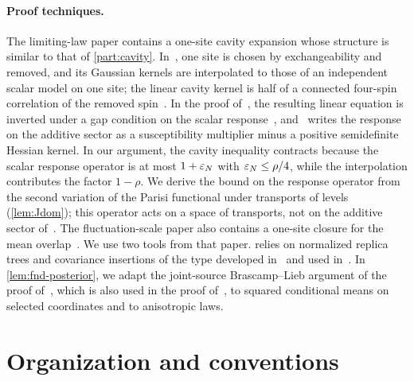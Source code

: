 \paragraph{Proof techniques.}
The limiting-law paper contains a one-site cavity expansion whose
structure is similar to that of \cref{part:cavity}.
In~\cite[Lemma~2.2]{OpenAILimitingLaw}, one site is chosen by
exchangeability and removed, and its Gaussian kernels are interpolated
to those of an independent scalar model on one site; the linear cavity
kernel is half of a connected four-spin correlation of the removed
spin~\cite[(A8)]{OpenAILimitingLaw}. In the proof
of~\cite[Proposition~6.1]{OpenAILimitingLaw}, the resulting linear
equation is inverted under a gap condition on the scalar
response~\cite[Proposition~5.1, (H1)]{OpenAILimitingLaw},
and~\cite[Lemma~5.2, (H2)]{OpenAILimitingLaw} writes the response on
the additive sector as a susceptibility multiplier minus a positive
semidefinite Hessian kernel. In our argument, the cavity inequality
contracts because the scalar response operator is at most $1+\varepsilon_N$
with $\varepsilon_N\le\rho/4$, while the interpolation contributes the factor
$1-\rho$. We derive the bound on the response operator from the second
variation of the Parisi functional under transports of levels
(\cref{lem:Jdom}); this operator acts on a space of transports, not on
the additive sector of~\cite{OpenAILimitingLaw}. The fluctuation-scale
paper also contains a one-site closure for the mean
overlap~\cite[Proposition~4.1]{OpenAIFluctuationScale}. We use two
tools from that paper.  relies on normalized replica
trees and covariance insertions of the type developed
in~\cite[Section~2]{OpenAIFluctuationScale} and used
in~\cite[Sections~2.1--2.3]{OpenAILimitingLaw}. In
\cref{lem:fnd-posterior}, we adapt the joint-source Brascamp--Lieb
argument of the proof of~\cite[Lemma~2.3]{OpenAIFluctuationScale}, which
is also used in the proof of~\cite[Lemma~2.1]{OpenAILimitingLaw}, to
squared conditional means on selected coordinates and to anisotropic
laws.



\section{Organization and conventions}\label{sec:intro-organization}


